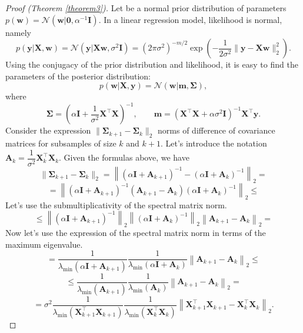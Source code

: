 \documentclass[
11pt,%
tightenlines,%
twoside,%
onecolumn,%
nofloats,%
nobibnotes,%
nofootinbib,%
superscriptaddress,%
noshowpacs,%
centertags]%
{revtex4-2}
\begin{document}
\begin{proof}[Proof (Theorem \ref{theorem3})]
Let be a normal prior distribution of parameters $p(\mathbf{w})=\mathcal{N}\left(\mathbf{w}|\mathbf{0}, \alpha^{-1}\mathbf{I}\right)$. In a linear regression model, likelihood is normal, namely
    \[ p(\mathbf{y} | \mathbf{X}, \mathbf{w}) = \mathcal{N}\left(\mathbf{y} |\mathbf{X}\mathbf{w}, \sigma^2\mathbf{I}\right) =\left( 2\pi\sigma^2\right)^{-m/2} \exp\left( -\dfrac{1}{2\sigma^2} \|\mathbf{y} - \mathbf{X}\mathbf{w}\|_2^2\right). \]
Using the conjugacy of the prior distribution and likelihood, it is easy to find the parameters of the posterior distribution:
    \[ p(\mathbf{w} | \mathbf{X}, \mathbf{y}) = \mathcal{N}\left(\mathbf{w} | \mathbf{m}, \mathbf{\Sigma} \right), \]
where
    \[ \mathbf{\Sigma} = \left( \alpha \mathbf{I} + \dfrac{1}{\sigma^2} \mathbf{X}^{\top} \mathbf{X} \right)^{-1}, \qquad \mathbf{m} = \left( \mathbf{X}^{\top} \mathbf{X} + \alpha \sigma^2 \mathbf{I} \right)^{-1} \mathbf{X}^{\top} \mathbf{y}. \]
Consider the expression $\|\mathbf{\Sigma}_{k+1} - \mathbf{\Sigma}_k\|_2$ norms of difference of covariance matrices for subsamples of size $k$ and $k+1$. Let's introduce the notation $\mathbf{A}_k = \dfrac{1}{\sigma^2}\mathbf{X}^{\top}_k\mathbf{X}_k$. Given the formulas above, we have
    \[ \| \mathbf{\Sigma}_{k+1} - \mathbf{\Sigma}_k \|_2 = \left\| \left( \alpha \mathbf{I} + \mathbf{A}_{k+1} \right)^{-1} - \left( \alpha \mathbf{I} + \mathbf{A}_k \right)^{-1} \right\|_2 = \]
    \[ = \left\| \left( \alpha \mathbf{I} + \mathbf{A}_{k+1} \right)^{-1} \left( \mathbf{A}_{k+1} - \mathbf{A}_k \right) \left( \alpha \mathbf{I} + \mathbf{A}_k \right)^{-1} \right\|_2 \leqslant \]
    Let's use the submultiplicativity of the spectral matrix norm.
    \[ \leqslant \left\| \left( \alpha \mathbf{I} + \mathbf{A}_{k+1} \right)^{-1} \right\|_2 \left\| \left( \alpha \mathbf{I} + \mathbf{A}_k \right)^{-1} \right\|_2 \left\| \mathbf{A}_{k+1} - \mathbf{A}_k \right\|_2 = \]
    Now let's use the expression of the spectral matrix norm in terms of the maximum eigenvalue.
    \[ = \dfrac{1}{\lambda_{\min}\left( \alpha \mathbf{I} + \mathbf{A}_{k+1} \right)} \dfrac{1}{\lambda_{\min}\left( \alpha \mathbf{I} + \mathbf{A}_k \right)} \left\| \mathbf{A}_{k+1} - \mathbf{A}_k \right\|_2 \leqslant \]
    \[ \leqslant \dfrac{1}{\lambda_{\min}\left( \mathbf{A}_{k+1} \right)} \dfrac{1}{\lambda_{\min}\left( \mathbf{A}_k \right)} \left\| \mathbf{A}_{k+1} - \mathbf{A}_k \right\|_2 = \]
    \[ = \sigma^2  \dfrac{1}{\lambda_{\min}\left( \mathbf{X}^{\top}_{k+1} \mathbf{X}_{k+1} \right)} \dfrac{1}{\lambda_{\min}\left( \mathbf{X}^{\top}_k \mathbf{X}_k \right)} \left\| \mathbf{X}^{\top}_{k+1} \mathbf{X}_{k+1} - \mathbf{X}^{\top}_k \mathbf{X}_k \right\|_2. \]

\end{proof}
\end{document}
